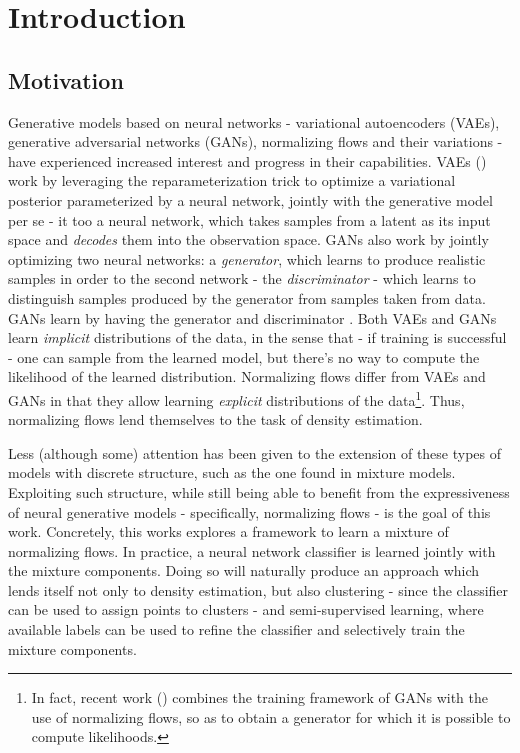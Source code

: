 \chapter{Introduction}
\label{chapter:introduction}

\section{Motivation}
\label{section:motivation}

Generative models based on neural networks - variational autoencoders (VAEs),
generative adversarial networks (GANs), normalizing flows and their variations -
have experienced increased interest and progress in their capabilities. VAEs
(\autocite{vaepaper}) work by leveraging the reparameterization trick to optimize
a variational posterior parameterized by a neural network, jointly with the generative
model per se - it too a neural network, which takes samples from a latent as its
input space and \emph{decodes} them into the observation space. GANs also work by
jointly optimizing two neural networks: a \emph{generator}, which learns to produce
realistic samples in order to  the second network - the \emph{discriminator} - which
learns to distinguish samples produced by the generator from samples taken from data. GANs learn
by having the generator and discriminator . Both VAEs and GANs learn
\emph{implicit} distributions of the data, in the sense that - if training is
successful - one can sample from the learned model, but there's no way to compute
the likelihood of the learned distribution. Normalizing flows differ from VAEs
and GANs in that they allow learning \emph{explicit} distributions of the
data\footnote{In fact, recent work (\autocite{flowgan}) combines the training
framework of GANs with the use of normalizing flows, so as to obtain a generator
for which it is possible to compute likelihoods.}. Thus, normalizing flows lend
themselves to the task of density estimation.

Less (although some) attention has been given to the extension of these types
of models with discrete structure, such as the one found in mixture models.
Exploiting such structure, while still being able to benefit from the expressiveness
of neural generative models - specifically, normalizing flows - is the goal of this
work. Concretely, this works explores a framework to learn a mixture of normalizing
flows. In practice, a neural network classifier is learned jointly with the mixture
components. Doing so will naturally produce an approach which lends itself not
only to density estimation, but also clustering - since the classifier can be used
to assign points to clusters - and semi-supervised learning, where available
labels can be used to refine the classifier and selectively train the mixture
components.

